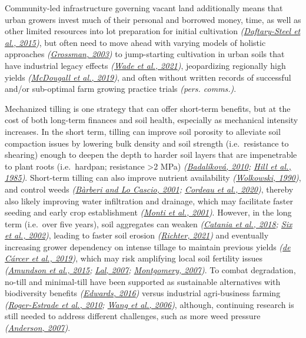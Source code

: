 \documentclass[
  12pt,
]{article}
\begin{document}
Community-led infrastructure governing vacant land additionally means that urban growers invest much of their personal and borrowed money, time, as well as other limited resources into lot preparation for initial cultivation \emph{(\protect\hyperlink{ref-daftary-steel15}{Daftary-Steel et al., 2015})},
but often need to move ahead with varying models of holistic approaches \emph{(\protect\hyperlink{ref-grossman03}{Grossman, 2003})} to jump-starting cultivation in urban soils that have industrial legacy effects \emph{(\protect\hyperlink{ref-wade21}{Wade et al., 2021})}, jeopardizing regionally high yields \emph{(\protect\hyperlink{ref-mcdougall19}{McDougall et al., 2019})}, and often without written records of successful and/or sub-optimal farm growing practice trials \emph{(pers. comms.)}.

Mechanized tilling is one strategy that can offer short-term benefits, but at the cost of both long-term finances and soil health, especially as mechanical intensity increases.
In the short term, tilling can improve soil porosity to alleviate soil compaction issues by lowering bulk density and soil strength (i.e.~resistance to shearing) enough to deepen the depth to harder soil layers that are impenetrable to plant roots (i.e.~hardpan; resistance \textgreater2 MPa) \emph{(\protect\hyperlink{ref-badalikova10}{Badalíková, 2010}; \protect\hyperlink{ref-hill85}{Hill et al., 1985})}.
Short-term tilling can also improve nutrient availability \emph{(\protect\hyperlink{ref-wolkowski90}{Wolkowski, 1990})}, and control weeds \emph{(\protect\hyperlink{ref-barberi01}{Bàrberi and Lo Cascio, 2001}; \protect\hyperlink{ref-cordeau20}{Cordeau et al., 2020})}, thereby also likely improving water infiltration and drainage, which may facilitate faster seeding and early crop establishment \emph{(\protect\hyperlink{ref-monti01}{Monti et al., 2001})}.
However, in the long term (i.e.~over five years), soil aggregates can weaken \emph{(\protect\hyperlink{ref-catania18}{Catania et al., 2018}; \protect\hyperlink{ref-six02a}{Six et al., 2002})}, leading to faster soil erosion \emph{(\protect\hyperlink{ref-richter21}{Richter, 2021})} and eventually increasing grower dependency on intense tillage to maintain previous yields \emph{(\protect\hyperlink{ref-decarcer19}{de Cárcer et al., 2019})},
which may risk amplifying local soil fertility issues
\emph{(\protect\hyperlink{ref-amundson15}{Amundson et al., 2015}; \protect\hyperlink{ref-lal07}{Lal, 2007}; \protect\hyperlink{ref-montgomery07}{Montgomery, 2007})}.
To combat degradation, no-till and minimal-till have been supported as sustainable alternatives with biodiversity benefits \emph{(\protect\hyperlink{ref-edwards16}{Edwards, 2016})} versus industrial agri-business farming \emph{(\protect\hyperlink{ref-roger-estrade10}{Roger-Estrade et al., 2010}; \protect\hyperlink{ref-wang06}{Wang et al., 2006})}, although, continuing research is still needed to address different challenges, such as more weed pressure \emph{(\protect\hyperlink{ref-anderson07}{Anderson, 2007})}.
\end{document}
